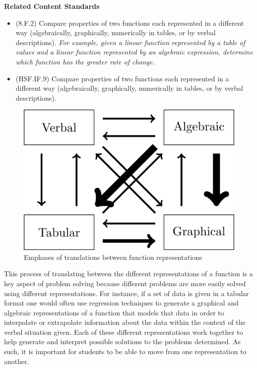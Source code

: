 \documentclass[
]{book}
\providecommand{\tightlist}{%
  \setlength{\itemsep}{0pt}\setlength{\parskip}{0pt}}
\newenvironment{standards}{}{}
\theoremstyle{definition}
\theoremstyle{definition}
\theoremstyle{definition}
\theoremstyle{definition}
\theoremstyle{remark}
\begin{document}
\begin{standards}

\begin{center}
\textbf{Related Content Standards}

\end{center}

\begin{itemize}
\tightlist
\item
  (8.F.2) Compare properties of two functions each represented in a different way (algebraically, graphically, numerically in tables, or by verbal descriptions). \emph{For example, given a linear function represented by a table of values and a linear function represented by an algebraic expression, determine which function has the greater rate of change.}
\item
  (HSF.IF.9) Compare properties of two functions each represented in a different way (algebraically, graphically, numerically in tables, or by verbal descriptions).
\end{itemize}

\end{standards}

\begin{figure}

{\centering \includegraphics[width=0.45\linewidth]{tikz/representation-emphasis} 

}

\caption{Emphases of translations between function representations}\label{fig:representation-emphasis}
\end{figure}

This process of translating between the different representations of a function is a key aspect of problem solving because different problems are more easily solved using different representations. For instance, if a set of data is given in a tabular format one would often use regression techniques to generate a graphical and algebraic representations of a function that models that data in order to interpolate or extrapolate information about the data within the context of the verbal situation given. Each of these different representations work together to help generate and interpret possible solutions to the problems determined. As such, it is important for students to be able to move from one representation to another.
\end{document}
